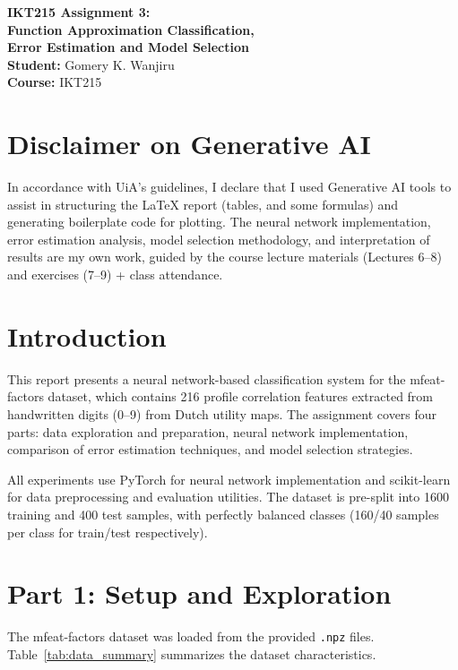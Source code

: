 \documentclass[11pt]{article}
\begin{document}
\begin{titlepage}
	\centering
	\vspace*{2cm}
	\Huge\textbf{IKT215 Assignment 3: \\ Function Approximation Classification, \\ Error Estimation and Model Selection} \\
	\vspace{1.5cm}
	\Large \textbf{Student:} Gomery K. Wanjiru \\
	\Large \textbf{Course:} IKT215 \\
	\vfill
	\section*{Disclaimer on Generative AI}
	In accordance with UiA's guidelines, I declare that I used Generative AI tools to assist in structuring the LaTeX report (tables, and some formulas) and generating boilerplate code for plotting. The neural network implementation, error estimation analysis, model selection methodology, and interpretation of results are my own work, guided by the course lecture materials (Lectures 6--8) and exercises (7--9) + class attendance.
\end{titlepage}

\newpage
\section{Introduction}
This report presents a neural network-based classification system for the mfeat-factors dataset, which contains 216 profile correlation features extracted from handwritten digits (0--9) from Dutch utility maps. The assignment covers four parts: data exploration and preparation, neural network implementation, comparison of error estimation techniques, and model selection strategies.

All experiments use PyTorch for neural network implementation and scikit-learn for data preprocessing and evaluation utilities. The dataset is pre-split into 1600 training and 400 test samples, with perfectly balanced classes (160/40 samples per class for train/test respectively).

\section{Part 1: Setup and Exploration}

The mfeat-factors dataset was loaded from the provided \texttt{.npz} files. Table~\ref{tab:data_summary} summarizes the dataset characteristics.
\end{document}
